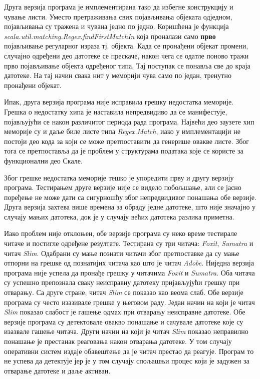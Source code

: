 \documentclass[12pt,oneside]{memoir}
\begin{document}
Друга верзија програма је имплементирана тако да избегне конструкцију и чување листи. Уместо претраживања свих појављивања објеката одједном, појављивања су тражена и чувана једно по једно. Коришћена је функција \textit{scala.util.matching.Regex.findFirstMatchIn} која проналази само \textbf{прво} појављивање регуларног израза тј. објекта. Када се пронађени објекат промени, случајно одређени део датотеке се прескаче, након чега се одатле поново тражи прво појављивање објекта одређеног типа. Тај поступак се понавља све до краја датотеке. На тај начин свака нит у меморији чува само по један, тренутно пронађени објекат.

Ипак, друга верзија програма није исправила грешку недостатка меморије. Грешка о недостатку хипа је наставила непредвидиво да се манифестује, појављујући се након различитог периода рада програма. Највећи део заузете хип меморије су и даље биле листе типа \textit{Regex.Match}, иако у имплементацији не постоји део кода за који се може претпоставити да генерише овакве листе. Због тога се претпоставља да је проблем у структурама података које се користе за функционални део Скале.

Због грешке недостатка меморије тешко је упоредити прву и другу верзију програма. Тестирањем друге верзије није се видело побољшање, али се јасно поређење не може дати са сигурношћу због непредвидивог понашања обе верзије. Друга верзија захтева више времена за обраду једне датотеке, што није значајно у случају мањих датотека, док је у случају већих датотека разлика приметна.

Иако проблем није отклоњен, обе верзије програма су неко време тестирале читаче и постигле одређене резултате. Тестирана су три читача: \textit{Foxit}, \textit{Sumatra} и читач \textit{Slim}. Одабрани су мање познати читачи због претпоставке да су мање отпорни на грешке од познатијих читача као што је читач  \textit{Adobe}. Ниједна верзија програма није успела да пронађе грешку у читачима \textit{Foxit} и \textit{Sumatra}. Оба читача су успешно препознала сваку неисправну датотеку пријављујући грешку при отварању. Са друге стране, читач \textit{Slim} се показао као веома слаб. Обе верзије програма су често изазивале грешке у његовом раду. Један начин на који је читач \textit{Slim} показао слабост је гашење одмах при отварању неисправне датотеке. Обе верзије програма су детектовале овакво понашање и сачувале датотеке које су изазвале гашење читача. Други начин на који је читач \textit{Slim} показао неправилно понашање је престанак реаговања након отварања датотеке. У том случају оперативни систем издаје обавештење да је читач престао да реагује. Програм то не успева да детектује јер је у том случају спољашњи процес који је задужен за отварање датотеке и даље активан.
\end{document}
